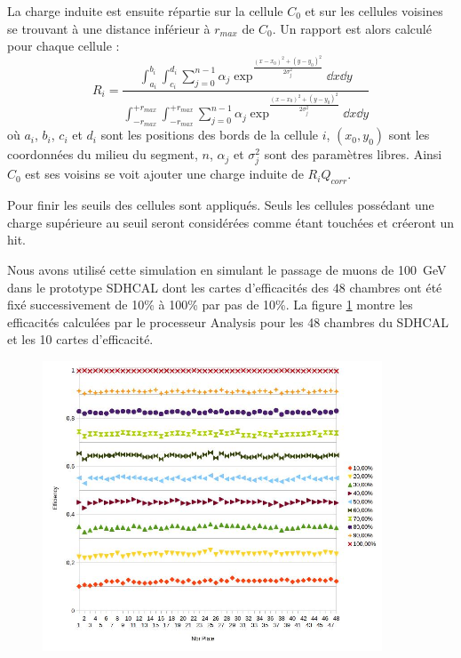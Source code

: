 La charge induite est ensuite répartie sur la cellule $C_0$ et sur les cellules voisines se trouvant à une distance inférieur à $r_{max}$ de $C_0$. Un rapport est alors calculé pour chaque cellule :
 \begin{equation}
 R_i=\frac{\int_{a_i}^{b_i}\int_{c_i}^{d_i}\sum_{j=0}^{n-1}\alpha_j\exp^{\frac{(x-x_0)^2+(y-y_0)^2}{2\sigma_j^2}}\dd x\dd y}{\int_{-r_{max}}^{+r_{max}}\int_{-r_{max}}^{+r_{max}}\sum_{j=0}^{n-1}\alpha_j\exp^{\frac{(x-x_0)^2+(y-y_0)^2}{2\sigma_j^2}}\dd x\dd y}
 \end{equation}
où $a_i$, $b_i$, $c_i$ et $d_i$ sont les positions des bords de la cellule $i$, $(x_0,y_0)$ sont les coordonnées du milieu du segment, $n$, $\alpha_j$ et $\sigma_j^2$ sont des paramètres libres. Ainsi $C_0$ est ses voisins se voit ajouter une charge induite de $R_iQ_{corr}$.

Pour finir les seuils des cellules sont appliqués. Seuls les cellules possédant une charge supérieure au seuil seront considérées comme étant touchées et créeront un hit.

Nous avons utilisé cette simulation en simulant le passage de muons de \SI{100}{\giga\eV} dans le prototype SDHCAL dont les cartes d'efficacités des \num{48} chambres ont été fixé successivement de 10\% à 100\% par pas de 10\%. La figure \ref{effisimul} montre les efficacités calculées par le processeur Analysis pour les \num{48} chambres du SDHCAL et les \num{10} cartes d'efficacité.

\begin{figure}[ht!]
	\centering
	\includegraphics[width=0.9\textwidth]{GLA/effisimul.jpg}
	\label{effisimul}
\end{figure}

